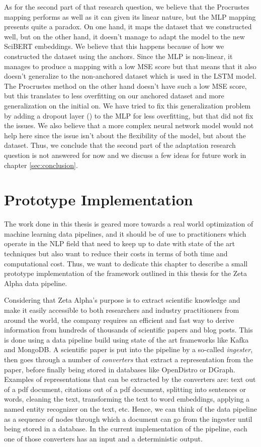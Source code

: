 \documentclass[12pt]{extreport}
\begin{document}
As for the second part of that research question, we believe that the Procrustes mapping performs as well as it can given its linear nature, but the MLP mapping presents quite a paradox. On one hand, it maps the dataset that we constructed well, but on the other hand, it doesn't manage to adapt the model to the new SciBERT embeddings. We believe that this happens because of how we constructed the dataset using the anchors. Since the MLP is non-linear, it manages to produce a mapping with a low MSE score but that means that it also doesn't generalize to the non-anchored dataset which is used in the LSTM model. The Procrustes method on the other hand doesn't have such a low MSE score, but this translates to less overfitting on our anchored dataset and more generalization on the initial on. We have tried to fix this generalization problem by adding a dropout layer (\cite{dropout}) to the MLP for less overfitting, but that did not fix the issues. We also believe that a more complex neural network model would not help here since the issue isn't about the flexibility of the model, but about the dataset. Thus, we conclude that the second part of the adaptation research question is not answered for now and we discuss a few ideas for future work in chapter \ref{sec:conclusion}.

\chapter{Prototype Implementation} \label{sec:prototype}

The work done in this thesis is geared more towards a real world optimization of machine learning data pipelines, and it should be of use to practitioners which operate in the NLP field that need to keep up to date with state of the art techniques but also want to reduce their costs in terms of both time and computational cost. Thus, we want to dedicate this chapter to describe a small prototype implementation of the framework outlined in this thesis for the Zeta Alpha data pipeline.

Considering that Zeta Alpha's purpose is to extract scientific knowledge and make it easily accessible to both researchers and industry practitioners from around the world, the company requires an efficient and fast way to derive information from hundreds of thousands of scientific papers and blog posts. This is done using a data pipeline build using state of the art frameworks like Kafka and MongoDB. A scientific paper is put into the pipeline by a so-called \emph{ingester}, then goes through a number of \emph{converters} that extract a representation from the paper, before finally being stored in databases like OpenDistro or DGraph. Examples of representations that can be extracted by the converters are: text out of a pdf document, citations out of a pdf document, splitting into sentences or words, cleaning the text, transforming the text to word embeddings, applying a named entity recognizer on the text, etc. Hence, we can think of the data pipeline as a sequence of nodes through which a document can go from the ingester until being stored in a database. In the current implementation of the pipeline, each one of those converters has an input and a deterministic output.
\end{document}
